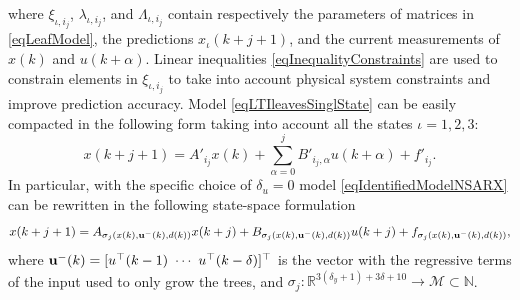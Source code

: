 \noindent where $\xi_{\iota,i_j}$, $\lambda_{\iota,i_j}$, and $\Lambda_{\iota,i_j}$ contain respectively the parameters of matrices in \eqref{eqLeafModel}, the predictions $x_\iota(k+j+1)$, and the current measurements of $x(k)$ and $u(k+\alpha)$. Linear inequalities \eqref{eqInequalityConstraints} are used to constrain elements in $\xi_{\iota,i_j}$ to take into account physical system constraints and improve prediction accuracy.
Model \eqref{eqLTIleavesSinglState} can be easily compacted in the following form taking into account all the states $\iota=1,2,3$:
\small
\begin{equation}\label{eqLTIleavesCompact}
x(k+j+1) = A'_{i_j}x(k) + \sum_{\alpha = 0}^{j}{B'_{i_j,\alpha}u(k+\alpha)} + f'_{i_j}.
\end{equation}
\normalsize
\noindent In particular, with the specific choice of $\delta_u = 0$ model \eqref{eqIdentifiedModelNSARX} can be rewritten in the following state-space formulation
\small
\begin{equation}\label{eqIdentifiedModelN}
x(k+j+1) =	A_{\sigma_j(x(k),\bold{u^-}(k),d(k))} x(k+j) + B_{\sigma_j(x(k),\bold{u^-}(k),d(k))} u(k+j) + f_{\sigma_j(x(k),\bold{u^-}(k),d(k))},
\end{equation}
\normalsize
where $\bold{u^-}(k) = [u^\top(k-1)\ \cdots\ u^\top(k-\delta)]^\top$ is the vector with the regressive terms of the input used to only grow the trees, and  $\sigma_j : \mathbb{R}^{3(\delta_y+1)+3\delta+10} \to \mathcal M \subset \mathbb{N}$.
%

